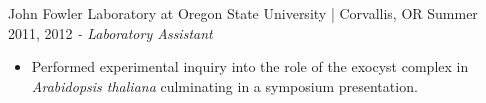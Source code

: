 John Fowler Laboratory at Oregon State University | Corvallis, OR \hfill Summer 2011, 2012 \newline
\textit{- Laboratory Assistant} \\
 \vspace{-4.5mm}
 \begin{itemize}
 \item Performed experimental inquiry into the role of the exocyst complex in \textit{Arabidopsis thaliana} culminating in a symposium presentation.
 \end{itemize}
  \vspace{-3.5mm}